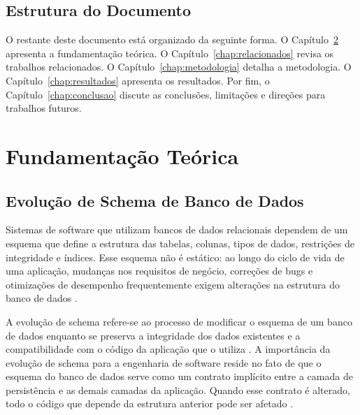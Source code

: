 \documentclass[
  12pt,
  openright,
  oneside,
  a4paper,
  brazil
]{abntex2}
\begin{document}
\section{Estrutura do Documento}

O restante deste documento está organizado da seguinte forma. O Capítulo~\ref{chap:fundamentacao} apresenta a fundamentação teórica. O Capítulo~\ref{chap:relacionados} revisa os trabalhos relacionados. O Capítulo~\ref{chap:metodologia} detalha a metodologia. O Capítulo~\ref{chap:resultados} apresenta os resultados. Por fim, o Capítulo~\ref{chap:conclusao} discute as conclusões, limitações e direções para trabalhos futuros.


\chapter{Fundamentação Teórica}\label{chap:fundamentacao}


\section{Evolução de Schema de Banco de Dados}

Sistemas de software que utilizam bancos de dados relacionais dependem de um esquema que define a estrutura das tabelas, colunas, tipos de dados, restrições de integridade e índices. Esse esquema não é estático: ao longo do ciclo de vida de uma aplicação, mudanças nos requisitos de negócio, correções de bugs e otimizações de desempenho frequentemente exigem alterações na estrutura do banco de dados \cite{roddick1992}.

A evolução de schema refere-se ao processo de modificar o esquema de um banco de dados enquanto se preserva a integridade dos dados existentes e a compatibilidade com o código da aplicação que o utiliza \cite{curino2008}. A importância da evolução de schema para a engenharia de software reside no fato de que o esquema do banco de dados serve como um contrato implícito entre a camada de persistência e as demais camadas da aplicação. Quando esse contrato é alterado, todo o código que depende da estrutura anterior pode ser afetado \cite{meurice2016}.
\end{document}
